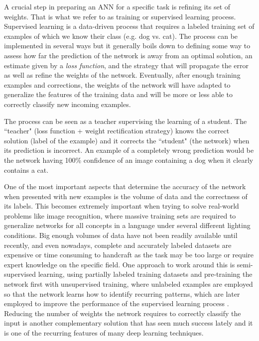 A crucial step in preparing an ANN for a specific task is refining its set of weights.
That is what we refer to as training or supervised learning process.
Supervised learning is a data-driven process that requires a labeled training set of examples of which we know their class (e.g. dog vs. cat).
The process can be implemented in several ways but it generally boils down to defining some way to assess how far the prediction of the network is away from an optimal solution, an estimate given by a \emph{loss function}, and the strategy that will propagate the error as well as refine the weights of the network.
Eventually, after enough training examples and corrections, the weights of the network will have adapted to generalize the features of the training data and will be more or less able to correctly classify new incoming examples.

The process can be seen as a teacher supervising the learning of a student.
The ``teacher" (loss function + weight rectification strategy) knows the correct solution (label of the example) and it corrects the ``student" (the network) when its prediction is incorrect.
An example of a completely wrong prediction would be the network having 100\% confidence of an image containing a dog when it clearly contains a cat.

One of the most important aspects that determine the accuracy of the network when presented with new examples is the volume of data and the correctness of its labels.
This becomes extremely important when trying to solve real-world problems like image recognition, where massive training sets are required to generalize networks for all concepts in a language under several different lighting conditions.
Big enough volumes of data have not been readily available until recently, and even nowadays, complete and accurately labeled datasets are expensive or time consuming to handcraft as the task may be too large or require expert knowledge on the specific field.
One approach to work around this is semi-supervised learning, using partially labeled training datasets and pre-training the network first with unsupervised training, where unlabeled examples are employed so that the network learns how to identify recurring patterns, which are later employed to improve the performance of the supervised learning process \cite{Zhu2008}.
Reducing the number of weights the network requires to correctly classify the input is another complementary solution that has seen much success lately and it is one of the recurring features of many deep learning techniques.


